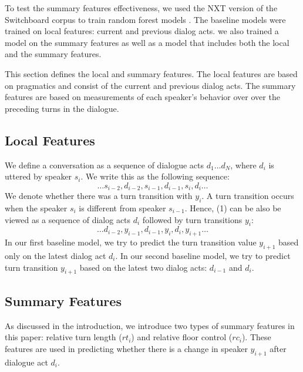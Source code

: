 To test the summary features effectiveness, we used the NXT version of the Switchboard corpus \cite{calhoun2010nxt,Godfrey-etal92:icassp} to train random forest models \cite{scikit-learn}. The baseline models were trained on local features: current and previous dialog acts. we also trained a model on the summary features as well as a model that includes both the local and the summary features.


  This section defines the local and summary features. The local features are based on pragmatics and consist of the current and previous dialog acts. The summary features are based on measurements of each speaker's behavior over over the preceding turns in the dialogue.

     \subsection{Local Features}

     We define a conversation as a sequence of dialogue acts $d_1 \dots d_N$, where $d_i$ is uttered by speaker $s_i$.  We write this as the following sequence:
%
     \begin{equation}
       \ldots  s_{i-2}, d_{i-2}, s_{i-1} , d_{i-1}, s_i, d_i  \ldots
     \end{equation}
     We denote whether there was a turn transition with $y_i$. A turn transition occurs when the speaker $s_i$ is different from speaker $s_{i-1}$. Hence, (1) can be also be viewed as a sequence of dialog acts $d_i$ followed by turn transitions $y_i$:
%
     \begin{equation}
       \ldots    d_{i-2}, y_{i-1}, d_{i-1}, y_{i} , d_i, y_{i+1} \ldots
     \end{equation}
      In our first baseline model, we try to predict the turn transition value $y_{i+1}$ based only on the latest dialog act $d_i$. In our second baseline model, we try to predict turn transition $y_{i+1}$ based on the latest two dialog acts: $d_{i-1}$ and $d_i$.


     \subsection{Summary Features}

     As discussed in the introduction, we introduce two types of summary features in this paper: relative turn length ($rt_i$) and relative floor control ($rc_i$).  These features are used in predicting whether there is a change in speaker $y_{i+1}$ after dialogue act $d_i$.

